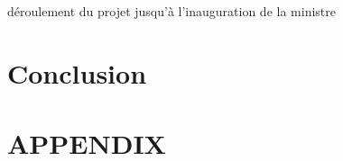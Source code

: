 \documentclass[letterpaper, 10 pt, conference]{IEEEtran}  %
\begin{document}
        déroulement du projet
        jusqu’à l’inauguration de la ministre




        \section{Conclusion}


        \addtolength{\textheight}{-12cm}   %
        \section*{APPENDIX}
\end{document}
